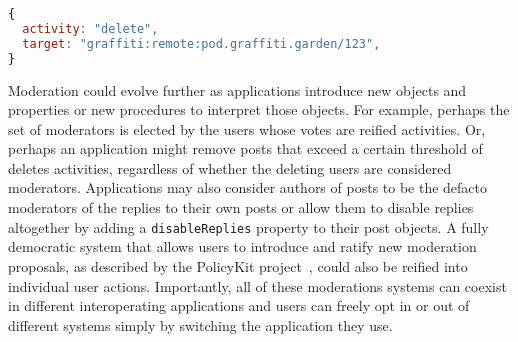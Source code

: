 \begin{lstlisting}[language=javascript]
{
  activity: "delete",
  target: "graffiti:remote:pod.graffiti.garden/123",
}
\end{lstlisting}

Moderation could evolve further as applications introduce new objects and properties
or new procedures to interpret those objects.
For example,
perhaps the set of moderators is elected by the users whose votes are reified activities.
Or, perhaps an application might remove posts that exceed a certain threshold of deletes activities,
regardless of whether the deleting users are considered moderators.
Applications may also consider authors of posts to be the defacto moderators of the replies to their
own posts or allow them to disable replies altogether by adding a \texttt{disableReplies}
property to their post objects.
A fully democratic system that allows users to introduce and ratify new moderation proposals,
as described by the PolicyKit project~\cite{policykit}, could also be reified into
individual user actions.
Importantly, all of these moderations systems can coexist in different interoperating
applications and users can freely opt in or out of different systems simply by switching
the application they use.





